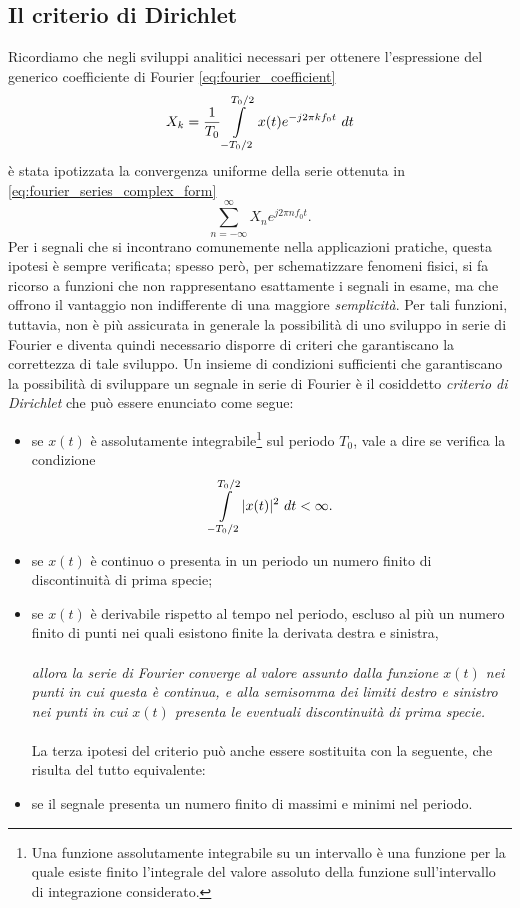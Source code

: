 \documentclass[12pt,oneside,openany]{memoir}
\numberwithin{equation}{subsection}
\DeclarePairedDelimiter{\abs}{\lvert}{\rvert}
\newcommand{\dt}{\ dt}
\begin{document}
\subsection{Il criterio di Dirichlet}
Ricordiamo che negli sviluppi analitici necessari per ottenere l'espressione del
generico coefficiente di Fourier \eqref{eq:fourier_coefficient}
\begin{equation}
	X_k = \frac{1}{T_0} \int\displaylimits_{-T_0/2}^{T_0/2} x(t)
	e^{-j 2 \pi k f_0 t} \dt
\end{equation}
\`e stata ipotizzata la convergenza uniforme della serie ottenuta in
\eqref{eq:fourier_series_complex_form}
\begin{equation}
	\sum_{n = -\infty}^{\infty} X_n e^{j 2 \pi n f_0 t}.
\end{equation}
Per i segnali che si incontrano comunemente nella applicazioni pratiche, questa
ipotesi \`e sempre verificata; spesso per\`o, per schematizzare fenomeni fisici,
si fa ricorso a funzioni che non rappresentano esattamente i segnali in esame,
ma che offrono il vantaggio non indifferente di una maggiore
\textit{semplicit\`a}. Per tali funzioni, tuttavia, non \`e pi\`u assicurata in
generale la possibilit\`a di uno sviluppo in serie di Fourier e diventa quindi
necessario disporre di criteri che garantiscano la correttezza di tale sviluppo.
\bigbreak
Un insieme di condizioni sufficienti che garantiscano la possibilit\`a di
sviluppare un segnale in serie di Fourier \`e il cosiddetto \textit{criterio di
Dirichlet} che pu\`o essere enunciato come segue:
\begin{itemize}
	\item se $x(t)$ \`e assolutamente integrabile\footnote{Una funzione
		assolutamente integrabile su un intervallo \`e una funzione per
		la quale esiste finito l'integrale del valore assoluto della
		funzione sull'intervallo di integrazione considerato.} sul
		periodo $T_0$, vale a dire se verifica la condizione
		\begin{equation}
			\int\displaylimits_{-T_0/2}^{T_0/2} \abs{x(t)}^2 \dt <
			\infty.
		\end{equation}
	\item se $x(t)$ \`e continuo o presenta in un periodo un numero finito
		di discontinuit\`a di prima specie;
	\item se $x(t)$ \`e derivabile rispetto al tempo nel periodo, escluso al
		pi\`u un numero finito di punti nei quali esistono finite la
		derivata destra e sinistra,\\
	\\
	\textit{allora la serie di Fourier converge al valore assunto dalla
		funzione $x(t)$ nei punti in cui questa \`e continua, e alla
		semisomma dei limiti destro e sinistro nei punti in cui $x(t)$
		presenta le eventuali discontinuit\`a di prima specie.}\\
	\\	
	La terza ipotesi del criterio pu\`o anche essere sostituita con la
		seguente, che risulta del tutto equivalente:
	\item se il segnale presenta un numero finito di massimi e minimi nel
		periodo.
\end{itemize}
\end{document}
